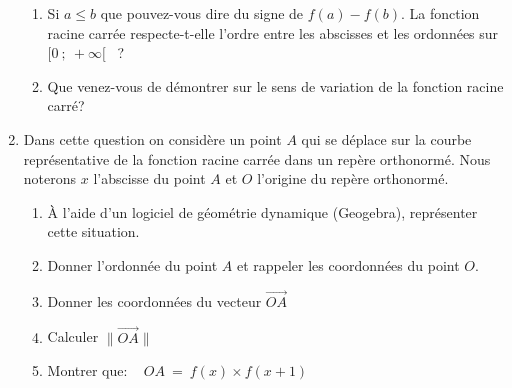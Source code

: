 \documentclass[a4paper,10pt]{article}
\begin{document}
\begin{enumerate}
\begin{enumerate}
	\item Si $ a \leq b  $ que pouvez-vous dire du signe de $f(a)-f(b)$. La fonction racine carrée respecte-t-elle l'ordre entre les abscisses et les ordonnées sur $[0~;~+\infty[$ ~? \\
	\item Que venez-vous de démontrer sur le sens de variation de la fonction racine carré? \\
\end{enumerate} 
\item Dans cette question on considère un point $A$ qui se déplace sur la courbe représentative de la fonction racine carrée dans un repère orthonormé. Nous noterons $x$ l'abscisse du point $A$ et $O$ l'origine du repère orthonormé.\\
\begin{enumerate}
	\item À l'aide d'un logiciel de géométrie dynamique (Geogebra), représenter cette situation. \\
	\item Donner l'ordonnée du point $A$ et rappeler les coordonnées du point $O$.\\ 
	\item Donner les coordonnées du vecteur $\vec{OA}$\\
	\item Calculer  $\|\vec{OA}\|$\\ 
	\item Montrer que: ~ $OA \ = \ f(x)\times f(x+1)$
\end{enumerate}  	 

\end{enumerate}


	
	
\end{document}
